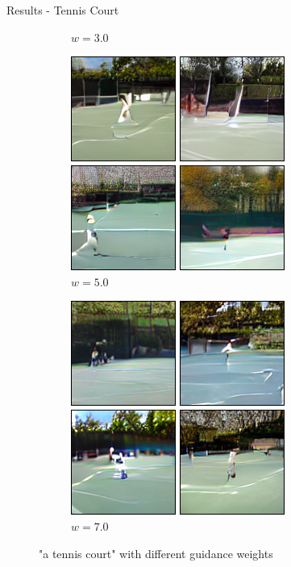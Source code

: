 \documentclass[11pt]{beamer}
\begin{document}
\begin{frame}{Results - Tennis Court}
\begin{figure}
\begin{subfigure}[b]{0.24\textwidth}
        \caption{$w=3.0$}
      \end{subfigure}
      \vspace{0.5em}
      \begin{subfigure}[b]{0.24\textwidth}
        \includegraphics[width=\linewidth]{figures/A_tennis_court_5.png}
        \caption{$w=5.0$}
      \end{subfigure}
      \begin{subfigure}[b]{0.24\textwidth}
        \includegraphics[width=\linewidth]{figures/A_tennis_court_7.png}
        \caption{$w=7.0$}
      \end{subfigure}
      \caption{"a tennis court" with different guidance weights}
    \end{figure}
  \end{frame}
\end{document}
